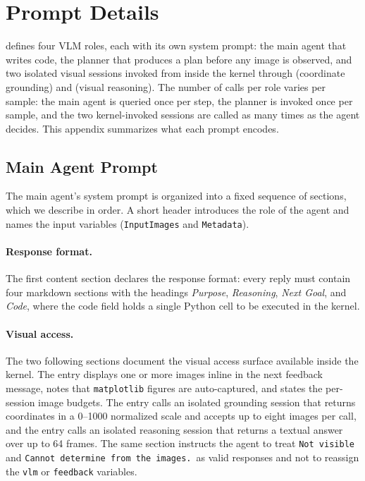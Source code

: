 \section{Prompt Details}
\label{app:prompts}

\ours{} defines four VLM roles, each with its own system prompt: the main agent that writes code, the planner that produces a plan before any image is observed, and two isolated visual sessions invoked from inside the kernel through  (coordinate grounding) and  (visual reasoning). The number of calls per role varies per sample: the main agent is queried once per step, the planner is invoked once per sample, and the two kernel-invoked sessions are called as many times as the agent decides. This appendix summarizes what each prompt encodes.

\subsection{Main Agent Prompt}
\label{app:prompt_main}
The main agent's system prompt is organized into a fixed sequence of sections, which we describe in order. A short header introduces the role of the agent and names the input variables (\texttt{InputImages} and \texttt{Metadata}).

\paragraph{Response format.}
The first content section declares the response format: every reply must contain four markdown sections with the headings \emph{Purpose}, \emph{Reasoning}, \emph{Next Goal}, and \emph{Code}, where the code field holds a single Python cell to be executed in the kernel.

\paragraph{Visual access.}
The two following sections document the visual access surface available inside the kernel. The  entry displays one or more images inline in the next feedback message, notes that \texttt{matplotlib} figures are auto-captured, and states the per-session image budgets. The  entry calls an isolated grounding session that returns coordinates in a 0--1000 normalized scale and accepts up to eight images per call, and the  entry calls an isolated reasoning session that returns a textual answer over up to 64 frames. The same section instructs the agent to treat \texttt{Not visible} and \texttt{Cannot determine from the images.}\ as valid responses and not to reassign the \texttt{vlm} or \texttt{feedback} variables.

